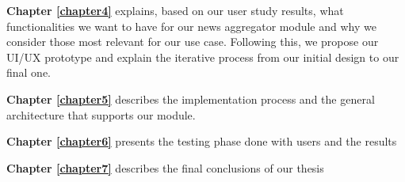     \textbf{Chapter \ref{chapter4}} explains, based on our user study results, what functionalities we want to have for our news aggregator module and why we consider those most relevant for our use case. Following this, we propose our UI/UX prototype and explain the iterative process from our initial design to our final one.
    
    \textbf{Chapter \ref{chapter5}} describes the implementation process and the general architecture that supports our module.
    
    \textbf{Chapter \ref{chapter6}} presents the testing phase done with users and the results
    
    \textbf{Chapter \ref{chapter7}} describes the final conclusions of our thesis
